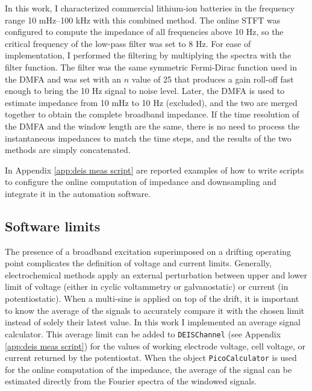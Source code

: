 In this work, I characterized commercial lithium-ion batteries in the frequency range 10 mHz--100 kHz with this combined method.
The online STFT was configured to compute the impedance of all frequencies above 10 Hz, so the critical frequency of the low-pass filter was set to 8 Hz.
For ease of implementation, I performed the filtering by multiplying the spectra with the filter function.
The filter was the same symmetric Fermi-Dirac function used in the DMFA and was set with an $n$ value of 25 that produces a gain roll-off fast enough to bring the 10 Hz signal to noise level.
Later, the DMFA is used to estimate impedance from 10 mHz to 10 Hz (excluded), and the two are merged together to obtain the complete broadband impedance.
If the time resolution of the DMFA and the window length are the same, there is no need to process the instantaneous impedances to match the time steps, and the results of the two methods are simply concatenated.

In Appendix \ref{app:deis meas script} are reported examples of how to write scripts to configure the online computation of impedance and downsampling and integrate it in the automation software.

\subsection{Software limits}
\label{sec:software_limits}

The presence of a broadband excitation superimposed on a drifting operating point complicates the definition of voltage and current limits.
Generally, electrochemical methods apply an external perturbation between upper and lower limit of voltage (either in cyclic voltammetry or galvanostatic) or current (in potentiostatic).
When a multi-sine is applied on top of the drift, it is important to know the average of the signals to accurately compare it with the chosen limit instead of solely their latest value.
In this work I implemented an average signal calculator.
This average limit can be added to \verb|DEISChannel| (see Appendix \ref{app:deis meas script}) for the values of working electrode voltage, cell voltage, or current returned by the potentiostat.
When the object \verb|PicoCalculator| is used for the online computation of the impedance, the average of the signal can be estimated directly from the Fourier spectra of the windowed signals.

